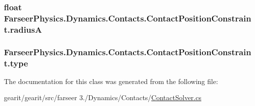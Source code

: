 \hypertarget{class_farseer_physics_1_1_dynamics_1_1_contacts_1_1_contact_position_constraint_a6545a760e686bd16539a742b7e6ebcae}{
\subsubsection[{radius\+A}]{\setlength{\rightskip}{0pt plus 5cm}float Farseer\+Physics.\+Dynamics.\+Contacts.\+Contact\+Position\+Constraint.\+radius\+A}}\label{class_farseer_physics_1_1_dynamics_1_1_contacts_1_1_contact_position_constraint_a6545a760e686bd16539a742b7e6ebcae}
\hypertarget{class_farseer_physics_1_1_dynamics_1_1_contacts_1_1_contact_position_constraint_acdc882d378baf697b37ce879a125bb2d}{
\subsubsection[{type}]{ Farseer\+Physics.\+Dynamics.\+Contacts.\+Contact\+Position\+Constraint.\+type}}\label{class_farseer_physics_1_1_dynamics_1_1_contacts_1_1_contact_position_constraint_acdc882d378baf697b37ce879a125bb2d}


The documentation for this class was generated from the following file\+:\begin{DoxyCompactItemize}
\item 
gearit/gearit/src/farseer 3./\+Dynamics/\+Contacts/\hyperlink{_contact_solver_8cs}{Contact\+Solver.\+cs}\end{DoxyCompactItemize}
